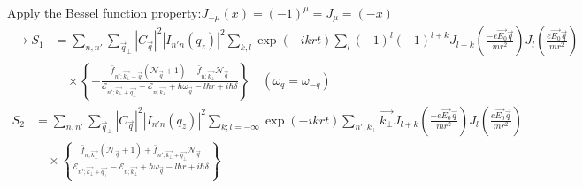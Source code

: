 \documentclass{article}
\begin{document}
Apply the Bessel function property:$J_{-\mu}(x)=(-1)^\mu=J_\mu=(-x)$
\begin{align*}
\rightarrow S_1 &= \sum_{n,n'} \sum_{\vec{q}_{\bot}} |C_{\vec{q}}|^2 |I_{n'n}(q_z)|^2 \sum_{k,l} \exp(-ikrt) \sum_{l} (-1)^l (-1)^{l+k} J_{l+k} \left( \frac{-e\vec{E_0} \vec{q}}{m r^2} \right) J_l \left( \frac{e\vec{E_0} \vec{q}}{m r^2} \right) \\
&\quad \times \left\{-\frac{\bar{f}_{n';\vec{k_\bot}+\vec{q}} (\mathcal{N}_{\vec{q}} + 1) - \bar{f}_{n;\vec{k_\bot}} \mathcal{N}_{\vec{q}}}{\mathcal{E}_{n';\vec{k_\bot}+\vec{q_\bot}} - \mathcal{E}_{n;\vec{k_\bot}} + \hbar \omega_{\vec{q}} - l\hbar r + i\hbar\delta} \right\} \quad (\omega_q = \omega_{-q})
\end{align*}
\begin{align*}
S_2 &= \sum_{n,n'} \sum_{\vec{q}_{\bot}} |C_{\vec{q}}|^2 |I_{n'n}(q_z)|^2 \sum_{k;l=-\infty} \exp(-ikrt) \sum_{n';k_\bot}\vec{k_\bot} J_{l+k} \left( \frac{-e\vec{E_0} \vec{q}}{m r^2} \right) J_l \left( \frac{e\vec{E_0} \vec{q}}{m r^2} \right) \\
&\quad \times \left\{\frac{\bar{f}_{n;\vec{k_\bot}} (\mathcal{N}_{\vec{q}} + 1) + \bar{f}_{n';\vec{k_\bot}+\vec{q_\bot}} \mathcal{N}_{\vec{q}}}{\mathcal{E}_{n';\vec{k_\bot}+\vec{q_\bot}} - \mathcal{E}_{n;\vec{k_\bot}} + \hbar \omega_{\vec{q}} - l\hbar r + i\hbar\delta} \right\}
\end{align*}
\end{document}
